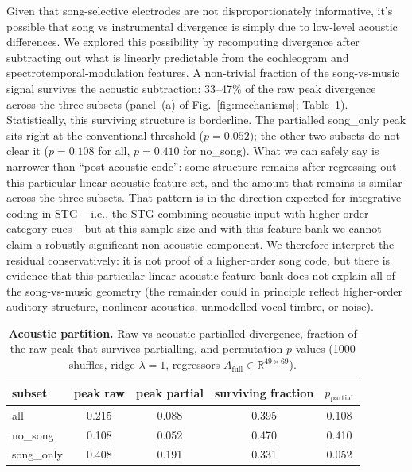 \documentclass[11pt]{article}
\begin{document}
Given that song-selective electrodes are not disproportionately informative, it’s possible that song vs instrumental divergence is simply due to low-level acoustic differences. We explored this possibility by recomputing divergence after subtracting out what is linearly predictable from the cochleogram and spectrotemporal-modulation features. A non-trivial fraction of the song-vs-music signal survives the acoustic subtraction: 33--47\% of the raw peak divergence across the three subsets (panel~(a) of Fig.~\ref{fig:mechanisms}; Table~\ref{tab:acoustic}). Statistically, this surviving structure is borderline. The partialled \textsf{song\_only} peak sits right at the conventional threshold ($p = 0.052$); the other two subsets do not clear it ($p = 0.108$ for \textsf{all}, $p = 0.410$ for \textsf{no\_song}). What we can safely say is narrower than ``post-acoustic code'': some structure remains after regressing out this particular linear acoustic feature set, and the amount that remains is similar across the three subsets. That pattern is in the direction expected for integrative coding in STG \citep{Yi2019,Leonard2024,Sankaran2024} -- i.e., the STG combining acoustic input with higher-order category cues -- but at this sample size and with this feature bank we cannot claim a robustly significant non-acoustic component. We therefore interpret the residual conservatively: it is not proof of a higher-order song code, but there is evidence that this particular linear acoustic feature bank does not explain all of the song-vs-music geometry (the remainder could in principle reflect higher-order auditory structure, nonlinear acoustics, unmodelled vocal timbre, or noise).

\begin{table}[t]
\centering\small
\caption{\textbf{Acoustic partition.} Raw vs acoustic-partialled divergence, fraction of the raw peak that survives partialling, and permutation $p$-values (1000 shuffles, ridge $\lambda=1$, regressors $A_\text{full} \in \mathbb{R}^{49\times 69}$).}
\label{tab:acoustic}
\begin{tabular}{lcccc}
\toprule
subset & peak raw & peak partial & surviving fraction & $p_\text{partial}$ \\
\midrule
all        & 0.215 & 0.088 & 0.395 & 0.108 \\
no\_song   & 0.108 & 0.052 & 0.470 & 0.410 \\
song\_only & 0.408 & 0.191 & 0.331 & 0.052 \\
\bottomrule
\end{tabular}
\end{table}
\end{document}
